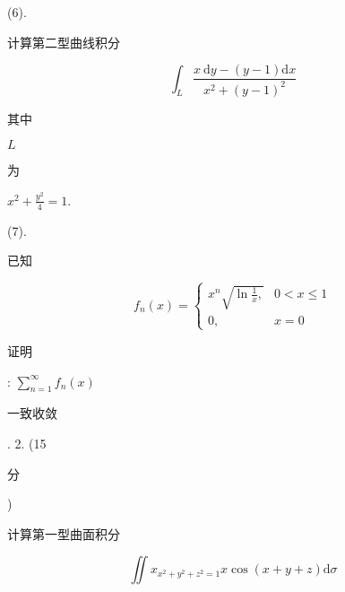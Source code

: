 \documentclass[10pt]{article}
\begin{document}
(6). \begin{CJK}{UTF8}{mj}计算第二型曲线积分\end{CJK}
$$
\int_{L} \frac{x \mathrm{~d} y-(y-1) \mathrm{d} x}{x^{2}+(y-1)^{2}}
$$
\begin{CJK}{UTF8}{mj}其中\end{CJK} $L$ \begin{CJK}{UTF8}{mj}为\end{CJK} $x^{2}+\frac{y^{2}}{4}=1$.

(7). \begin{CJK}{UTF8}{mj}已知\end{CJK}
$$
f_{n}(x)= \begin{cases}x^{n} \sqrt{\ln \frac{1}{x},} & 0<x \leqslant 1 \\ 0, & x=0\end{cases}
$$
\begin{CJK}{UTF8}{mj}证明\end{CJK}: $\sum_{n=1}^{\infty} f_{n}(x)$ \begin{CJK}{UTF8}{mj}一致收敛\end{CJK}. 2. (15 \begin{CJK}{UTF8}{mj}分\end{CJK}) \begin{CJK}{UTF8}{mj}计算第一型曲面积分\end{CJK}
$$
\iint x_{x^{2}+y^{2}+z^{2}=1} x \cos (x+y+z) \mathrm{d} \sigma
$$
\end{document}

